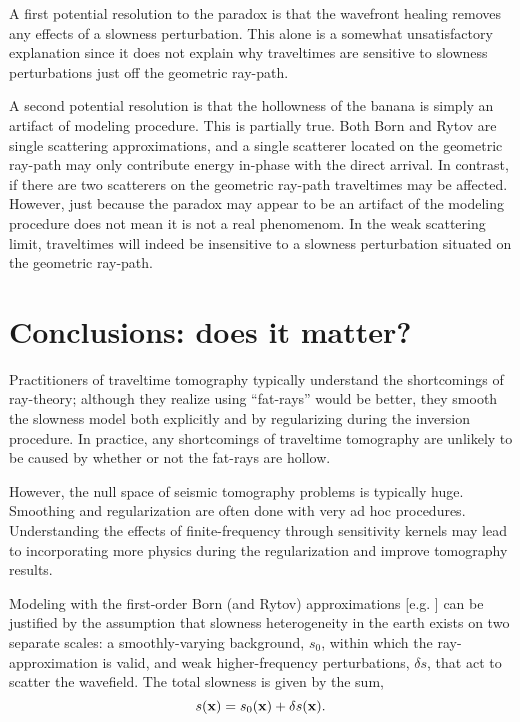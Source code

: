 \par
A first potential resolution to the paradox is that the wavefront
healing removes any effects of a slowness perturbation.  
This alone is a somewhat unsatisfactory explanation since it does not
explain why traveltimes are sensitive to slowness perturbations just
off the geometric ray-path.

\par
A second potential resolution is that the hollowness of the banana is
simply an artifact of modeling procedure.  This is partially true.
Both Born and Rytov are single scattering approximations, and a single
scatterer located on the geometric ray-path may only contribute energy
in-phase with the direct arrival.  In contrast, if there are two
scatterers on the geometric ray-path traveltimes may be affected.
However, just because the paradox may appear to be an artifact of the 
modeling procedure does not mean it is not a real phenomenom. 
In the weak scattering limit, traveltimes will indeed be insensitive
to a slowness perturbation situated on the geometric ray-path.

\section{Conclusions: does it matter?}
Practitioners of traveltime tomography typically understand the
shortcomings of ray-theory; although they realize using ``fat-rays''
would be better, they smooth the slowness model both explicitly and by 
regularizing during the inversion procedure. 
In practice, any shortcomings of traveltime tomography are unlikely to
be caused by whether or not the fat-rays are hollow. 

\par
However, the null space of seismic tomography problems is typically
huge.  Smoothing and regularization are often done with very ad 
hoc procedures.  Understanding the effects of finite-frequency through
sensitivity kernels may lead to incorporating more physics during the
regularization and improve tomography results.

  


Modeling with the first-order Born (and Rytov) approximations 
[e.g. \cite{beydoun88}] can be
justified by the assumption that slowness heterogeneity in the earth
exists on two separate scales: a smoothly-varying background,
$s_0$, within which the ray-approximation is valid, 
and weak higher-frequency perturbations, $\delta s$, that
act to scatter the wavefield.  
The total slowness is given by the sum,
\begin{equation}
s({\bf x})=s_0({\bf x})+\delta s({\bf x}).
\end{equation}

